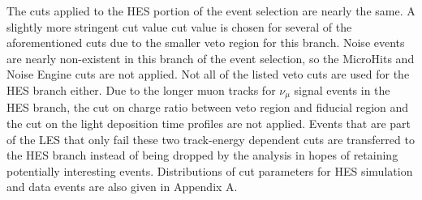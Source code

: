 \documentclass{gatech-thesis}
\begin{document}
The cuts applied to the HES portion of the event selection are nearly the same. A slightly more stringent cut value cut value is chosen for several of the aforementioned cuts due to the smaller veto region for this branch. Noise events are nearly non-existent in this branch of the event selection, so the MicroHits and Noise Engine cuts are not applied. Not all of the listed veto cuts are used for the HES branch either. Due to the longer muon tracks for $\nu_{\mu}$ signal events in the HES branch, the cut on charge ratio between veto region and fiducial region and the cut on the light deposition time profiles are not applied. Events that are part of the LES that only fail these two track-energy dependent cuts are transferred to the HES branch instead of being dropped by the analysis in hopes of retaining potentially interesting events. Distributions of cut parameters for HES simulation and data events are also given in Appendix A.
\end{document}

